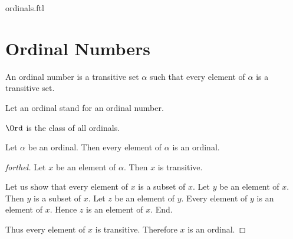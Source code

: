 \documentclass{naproche-library}
\begin{document}
\begin{smodule}{ordinals.ftl}


  \section*{Ordinal Numbers}

  \begin{definition}[forthel,id=SET_THEORY_02_229593678086144,printid]
    An ordinal number is a transitive set $\alpha$ such that every element of $\alpha$ is a transitive set.

    Let an ordinal stand for an ordinal number.
  \end{definition}

  \begin{definition}[forthel,id=SET_THEORY_02_5852994258075648,printid]
    $\Ord$ is the class of all ordinals.
  \end{definition}

  \begin{proposition}[forthel,id=SET_THEORY_02_2358097091756032,printid]
    Let $\alpha$ be an ordinal.
    Then every element of $\alpha$ is an ordinal.
  \end{proposition}
  \begin{proof}[forthel]
    Let $x$ be an element of $\alpha$.
    Then $x$ is transitive.

    Let us show that every element of $x$ is a subset of $x$.
      Let $y$ be an element of $x$.
      Then $y$ is a subset of $x$.
      Let $z$ be an element of $y$.
      Every element of $y$ is an element of $x$.
      Hence $z$ is an element of $x$.
    End.

    Thus every element of $x$ is transitive.
    Therefore $x$ is an ordinal.
  \end{proof}
\end{smodule}
\end{document}
